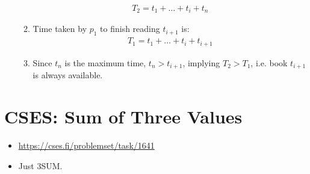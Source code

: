 \documentclass[titlepage, 12pt]{book}
\begin{document}
\begin{itemize}
\begin{enumerate}
\begin{align*}
                    T_2 = t_1 + \dots + t_i + t_n
                \end{align*}
            \item Time taken by $p_1$ to finish reading $t_{i + 1}$ is:
                \begin{align*}
                    T_1 = t_1 + \dots + t_i + t_{i + 1}
                \end{align*}
            \item Since $t_n$ is the maximum time, $t_n > t_{i + 1}$, implying
                $T_2 > T_1$, i.e. book $t_{i + 1}$ is always available.
        \end{enumerate}
\end{itemize}

\section{CSES: Sum of Three Values}
\begin{itemize}
    \item \url{https://cses.fi/problemset/task/1641}
    \item Just 3SUM.
\end{itemize}
\end{document}
